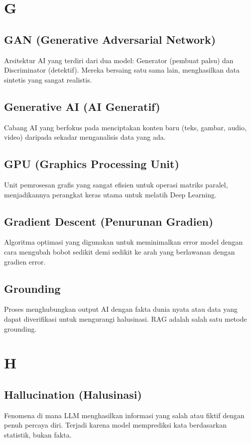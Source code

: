 \section*{G}

\subsection*{GAN (Generative Adversarial Network)}
Arsitektur AI yang terdiri dari dua model: Generator (pembuat palsu) dan Discriminator (detektif). Mereka bersaing satu sama lain, menghasilkan data sintetis yang sangat realistis.

\subsection*{Generative AI (AI Generatif)}
Cabang AI yang berfokus pada menciptakan konten baru (teks, gambar, audio, video) daripada sekadar menganalisis data yang ada.

\subsection*{GPU (Graphics Processing Unit)}
Unit pemrosesan grafis yang sangat efisien untuk operasi matriks paralel, menjadikannya perangkat keras utama untuk melatih Deep Learning.

\subsection*{Gradient Descent (Penurunan Gradien)}
Algoritma optimasi yang digunakan untuk meminimalkan error model dengan cara mengubah bobot sedikit demi sedikit ke arah yang berlawanan dengan gradien error.

\subsection*{Grounding}
Proses menghubungkan output AI dengan fakta dunia nyata atau data yang dapat diverifikasi untuk mengurangi halusinasi. RAG adalah salah satu metode grounding.

\section*{H}

\subsection*{Hallucination (Halusinasi)}
Fenomena di mana LLM menghasilkan informasi yang salah atau fiktif dengan penuh percaya diri. Terjadi karena model memprediksi kata berdasarkan statistik, bukan fakta.

